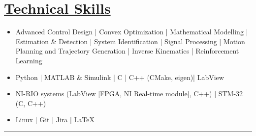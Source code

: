 \section*{\underline{Technical Skills}}
\begin{itemize}
        \item[\itbf{Control and Estimation:}] Advanced Control Design |
        Convex Optimization | Mathematical Modelling |
        Estimation \& Detection |
        System Identification | Signal Processing |
        Motion Planning and Trajectory Generation | Inverse Kinematics |
        Reinforcement Learning
        \item[\itbf{Programming:}] Python | MATLAB \& Simulink | C | C++ (CMake, eigen)| LabView
        \item[\itbf{Embedded Systems:}] NI-RIO systems (LabView [FPGA, NI Real-time module], C++) | STM-32 (C, C++)
        \item[\itbf{OS \& Tools:}] Linux | Git | Jira | \LaTeX
\end{itemize}
\noindent\rule{\textwidth}{0.4pt}
